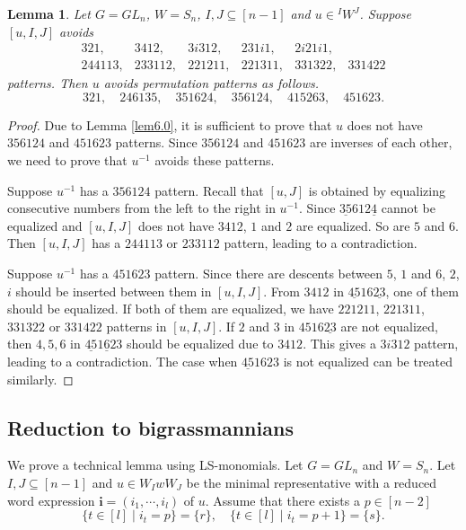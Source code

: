 \documentclass[12pt]{amsart}
\newtheorem{lemma}[theorem]{Lemma}
\theoremstyle{definition}
\theoremstyle{remark}
\begin{document}
\begin{lemma}\label{lem7.1}
Let $G = GL_n$, $W= S_n$, $I,J \subseteq [n-1]$ and $u \in {}^I W^J$. Suppose $[u,I,J]$ avoids
\begin{equation}\label{eqn7.3}
\begin{matrix}
321, & 3412, & 3i312, & 231i1, & 2i21i1, & \\
244113, & 233112, & 221211, & 221311, & 331322, & 331422
\end{matrix}
\end{equation}
patterns. Then $u$ avoids permutation patterns as follows.
\begin{equation}\label{eqn7.4}
321, \quad 246135, \quad 351624, \quad 356124, \quad 415263, \quad 451623.
\end{equation}
\end{lemma}
\begin{proof}
Due to Lemma \ref{lem6.0}, it is sufficient to prove that $u$ does not have $356124$ and $451623$ patterns. Since $356124$ and $451623$ are inverses of each other, we need to prove that $u^{-1}$ avoids these patterns.

Suppose $u^{-1}$ has a $356124$ pattern. Recall that $[u,J]$ is obtained by equalizing consecutive numbers from the left to the right in $u^{-1}$. Since $\underline{35}612\underline{4}$ cannot be equalized and $[u,I,J]$ does not have $3412$, $1$ and $2$ are equalized. So are $5$ and $6$. Then $[u,I,J]$ has a $244113$ or $233112$ pattern, leading to a contradiction.

Suppose $u^{-1}$ has a $451623$ pattern. Since there are descents between $5$, $1$ and $6$, $2$, $i$ should be inserted between them in $[u,I,J]$. From $3412$ in $\underline{45}16\underline{23}$, one of them should be equalized. If both of them are equalized, we have $221211$, $221311$, $331322$ or $331422$ patterns in $[u,I,J]$. If $2$ and $3$ in $4516\underline{23}$ are not equalized, then $4,5,6$ in $\underline{45}1\underline{6}23$ should be equalized due to $3412$. This gives a $3i312$ pattern, leading to a contradiction. The case when $\underline{45}1623$ is not equalized can be treated similarly.
\end{proof}



\subsection{Reduction to bigrassmannians}\label{sub6.2} 

We prove a technical lemma using LS-monomials. Let $G = GL_n$ and $W=S_n$. Let $I,J \subseteq [n-1]$ and $u \in W_I w W_J$ be the minimal representative with a reduced word expression $\mathbf{i} = (i_1 , \cdots , i_l)$ of $u$. Assume that there exists a $p \in [n-2]$
\begin{equation}\label{eqn6.11}
\{ t \in [l] \mid i_t = p\} = \{r\} , \quad \{t \in [l] \mid i_t = p+1 \} =\{s\}.
\end{equation}
\end{document}
